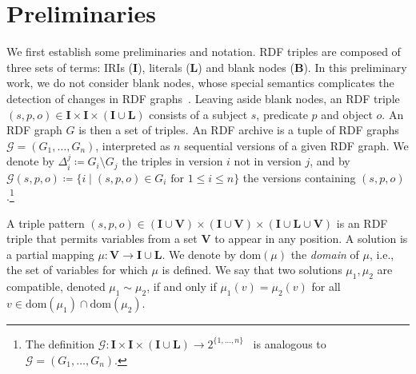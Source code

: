 \documentclass{llncs}
\newcommand{\B}{\ensuremath{\mathbf{B}}\xspace}
\newcommand{\I}{\ensuremath{\mathbf{I}}\xspace}
\renewcommand{\L}{\ensuremath{\mathbf{L}}\xspace}
\newcommand{\V}{\ensuremath{\mathbf{V}}\xspace}
\newcommand{\dom}[1]{\ensuremath{\mathrm{dom}(#1)}}
\begin{document}




\section{Preliminaries}

We first establish some preliminaries and notation. RDF triples are composed of three sets of terms: IRIs (\I), literals (\L) and blank nodes (\B). In this preliminary work, we do not consider blank nodes, whose special semantics complicates the detection of changes in RDF graphs~\cite{ZeginisTC11}. Leaving aside blank nodes, an RDF triple $(s,p,o) \in \I \times \I \times (\I \cup \L)$ consists of a subject $s$, predicate $p$ and object $o$. An RDF graph $G$ is then a set of triples. An RDF archive is a tuple of RDF graphs $\mathcal{G} = (G_1,\ldots,G_n)$, interpreted as $n$ sequential versions of a given RDF graph. We denote by $\Delta_{i}^j \coloneqq G_i \setminus G_j$ the triples in version $i$ not in version $j$, and by $\mathcal{G}(s,p,o) \coloneqq \{ i \mid (s,p,o) \in G_i\text{ for } 1 \leq i \leq n \}$ the versions containing $(s,p,o)$.\footnote{The definition $\mathcal{G} : \I \times \I \times (\I \cup \L) \rightarrow 2^{\{1,\ldots,n\}}$~\cite{FernandezUPK19} is analogous to $\mathcal{G} = (G_1,\ldots,G_n)$.}

A triple pattern $(s,p,o) \in (\I \cup \V) \times (\I \cup \V) \times (\I \cup \L \cup \V)$ is an RDF triple that permits variables from a set $\V$ to appear in any position. A solution is a partial mapping $\mu : \V \rightarrow \I \cup \L$. We denote by $\dom{\mu}$ the \textit{domain} of $\mu$, i.e., the set of variables for which $\mu$ is defined. We say that two solutions $\mu_1, \mu_2$ are compatible, denoted $\mu_1 \sim \mu_2$, if and only if $\mu_1(v) = \mu_2(v)$ for all $v \in \dom{\mu_1} \cap \dom{\mu_2}$.
\end{document}
